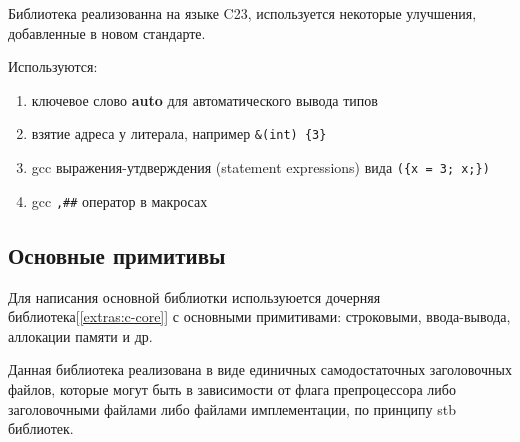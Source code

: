 Библиотека реализованна на языке C23, используется некоторые улучшения, добавленные в новом стандарте.

Используются:
\begin{enumerate}
  \item ключевое слово \textbf{auto} для автоматического вывода типов
  \item взятие адреса у литерала, например \verb|&(int) {3}|
  \item gcc выражения-утдверждения (statement expressions) вида \verb|({x = 3; x;})|
  \item gcc \verb|,##| оператор в макросах
\end{enumerate}


\subsection{Основные примитивы}
Для написания основной библиотки используюется дочерняя библиотека[\ref{extras:c-core}] с основными примитивами: 
строковыми, ввода-вывода, аллокации памяти и др.

Данная библиотека реализована в виде единичных самодостаточных заголовочных файлов, 
которые могут быть в зависимости от флага препроцессора либо заголовочными файлами либо файлами имплементации, 
по принципу stb библиотек\cite{stb_libs}.










